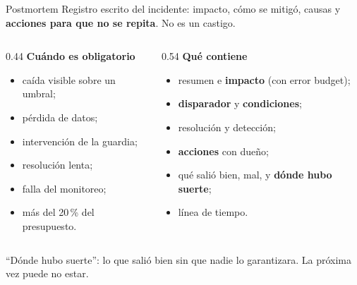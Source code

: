 \documentclass[institutional,screen,none]{ua-engineering-v6-beamer}
\begin{document}
\begin{frame}{Postmortem}
Registro escrito del incidente: impacto, cómo se mitigó, causas y \textbf{acciones para que no se repita}. No es un castigo.

\pause

\begin{columns}[T,onlytextwidth]
\begin{column}{0.44\textwidth}
\textbf{Cuándo es obligatorio}
\begin{itemize}\footnotesize
\item caída visible sobre un umbral;
\item pérdida de datos;
\item intervención de la guardia;
\item resolución lenta;
\item falla del monitoreo;
\item más del 20\,\% del presupuesto.
\end{itemize}
\end{column}
\begin{column}{0.54\textwidth}
\textbf{Qué contiene}
\begin{itemize}\footnotesize
\item resumen e \textbf{impacto} (con error budget);
\item \textbf{disparador} y \textbf{condiciones};
\item resolución y detección;
\item \textbf{acciones} con dueño;
\item qué salió bien, mal, y \textbf{dónde hubo suerte};
\item línea de tiempo.
\end{itemize}
\end{column}
\end{columns}

\pause

\vspace{0.4em}
{\small ``Dónde hubo suerte'': lo que salió bien sin que nadie lo garantizara. La próxima vez puede no estar.}
\end{frame}
\end{document}
